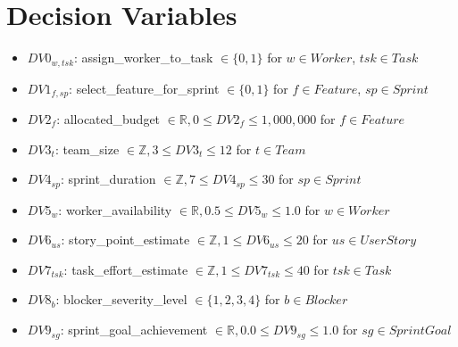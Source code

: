 \documentclass{article}
\begin{document}
\section{Decision Variables}
\begin{itemize}
    \item $DV0_{w, tsk}$: assign\_worker\_to_task $\in \{0, 1\}$ for $w \in Worker$, $tsk \in Task$
    \item $DV1_{f, sp}$: select\_feature\_for\_sprint $\in \{0, 1\}$ for $f \in Feature$, $sp \in Sprint$
    \item $DV2_{f}$: allocated\_budget $ \in \mathbb{R}, 0 \leq DV2_{f} \leq 1,000,000$ for $f \in Feature$
    \item $DV3_{t}$: team\_size $ \in \mathbb{Z}, 3 \leq DV3_{t} \leq 12$ for $t \in Team$
    \item $DV4_{sp}$: sprint\_duration $ \in \mathbb{Z}, 7 \leq DV4_{sp} \leq 30$ for $sp \in Sprint$
    \item $DV5_{w}$: worker\_availability $ \in \mathbb{R}, 0.5 \leq DV5_{w} \leq 1.0$ for $w \in Worker$
    \item $DV6_{us}$: story\_point\_estimate $ \in \mathbb{Z}, 1 \leq DV6_{us} \leq 20$ for $us \in UserStory$
    \item $DV7_{tsk}$: task\_effort\_estimate $ \in \mathbb{Z}, 1 \leq DV7_{tsk} \leq 40$ for $tsk \in Task$
    \item $DV8_{b}$: blocker\_severity\_level $ \in \{1, 2, 3, 4\}$ for $b \in Blocker$
    \item $DV9_{sg}$: sprint\_goal\_achievement $ \in \mathbb{R}, 0.0 \leq DV9_{sg} \leq 1.0$ for $sg \in SprintGoal$
\end{itemize}
\end{document}
